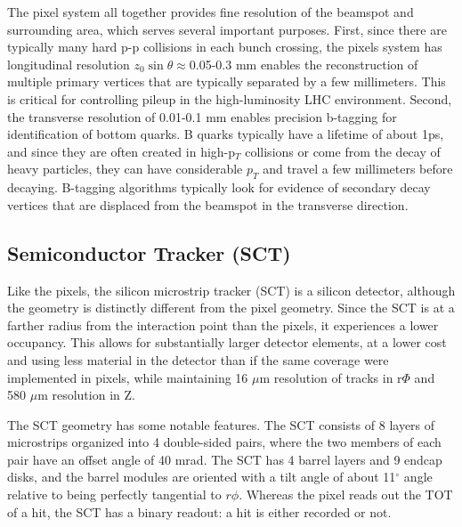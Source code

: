 The pixel system all together provides fine resolution of the beamspot and surrounding area, which serves several important purposes.  First, since there are typically many hard p-p collisions in each bunch crossing, the pixels system has longitudinal resolution $z_0\sin\theta\approx$0.05-0.3 mm enables the reconstruction of multiple primary vertices that are typically separated by a few millimeters.  This is critical for controlling pileup in the high-luminosity LHC environment.  Second, the transverse resolution of 0.01-0.1 mm enables precision b-tagging for identification of bottom quarks.  B quarks typically have a lifetime of about 1ps, and since they are often created in high-p$_T$ collisions or come from the decay of heavy particles, they can have considerable $p_T$ and travel a few millimeters before decaying.  B-tagging algorithms typically look for evidence of secondary decay vertices that are displaced from the beamspot in the transverse direction.   


\subsection{Semiconductor Tracker (SCT)}
\label{sec:sct}
Like the pixels, the silicon microstrip tracker (SCT) is a silicon detector, although the geometry is distinctly different from the pixel geometry.  Since the SCT is at a farther radius from the interaction point than the pixels, it experiences a lower occupancy.  This allows for substantially larger detector elements, at a lower cost and using less material in the detector than if the same coverage were implemented in pixels, while maintaining 16 $\mu$m resolution of tracks in r$\Phi$ and 580 $\mu$m resolution in Z.   

The SCT geometry has some notable features.  The SCT consists of 8 layers of microstrips organized into 4 double-sided pairs, where the two members of each pair have an offset angle of 40 mrad.  The SCT has 4 barrel layers and 9 endcap disks, and the barrel modules are oriented with a tilt angle of about 11$^\circ$ angle relative to being perfectly tangential to $r\phi$.  Whereas the pixel reads out the TOT of a hit, the SCT has a binary readout: a hit is either recorded or not.



